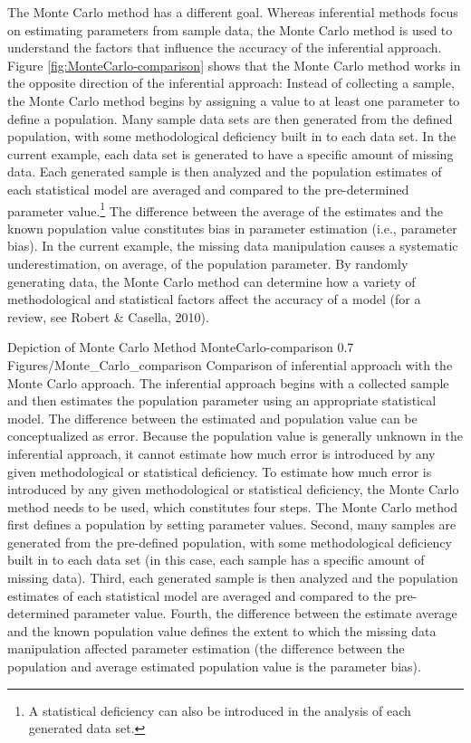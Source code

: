 \documentclass[
12pt, %
twoside,
english]{guelphthesis}
\theoremstyle{definition}
\theoremstyle{definition}
\theoremstyle{definition}
\theoremstyle{definition}
\theoremstyle{remark}
\begin{document}
The Monte Carlo method has a different goal. Whereas inferential methods focus on estimating parameters from sample data, the Monte Carlo method is used to understand the factors that influence the accuracy of the inferential approach. Figure \ref{fig:MonteCarlo-comparison} shows that the Monte Carlo method works in the opposite direction of the inferential approach: Instead of collecting a sample, the Monte Carlo method begins by assigning a value to at least one parameter to define a population. Many sample data sets are then generated from the defined population, with some methodological deficiency built in to each data set. In the current example, each data set is generated to have a specific amount of missing data. Each generated sample is then analyzed and the population estimates of each statistical model are averaged and compared to the pre-determined parameter value.\footnote{A statistical deficiency can also be introduced in the analysis of each generated data set.} The difference between the average of the estimates and the known population value constitutes bias in parameter estimation (i.e., parameter bias). In the current example, the missing data manipulation causes a systematic underestimation, on average, of the population parameter. By randomly generating data, the Monte Carlo method can determine how a variety of methodological and statistical factors affect the accuracy of a model (for a review, see Robert \& Casella, 2010).
\begin{apaFigure}
[landscape]
[samepage]
[0cm]
{Depiction of Monte Carlo Method}
{MonteCarlo-comparison}
{0.7}
{Figures/Monte_Carlo_comparison}
{Comparison of inferential approach with the Monte Carlo approach. The inferential approach begins with a collected sample and then estimates the population parameter using an appropriate statistical model. The difference between the estimated and population value can be conceptualized as error. Because the population value is generally unknown in the inferential approach, it cannot estimate how much error is introduced by any given methodological or statistical deficiency. To estimate how much error is introduced by any given methodological or statistical deficiency, the Monte Carlo method needs to be used, which constitutes four steps. The Monte Carlo method first defines a population by setting parameter values. Second, many samples are generated from the pre-defined population, with some methodological deficiency built in to each data set (in this case, each sample has a specific amount of missing data). Third, each generated sample is then analyzed and the population estimates of each statistical model are averaged and compared to the pre-determined parameter value. Fourth, the difference between the estimate average and the known population value defines the extent to which the missing data manipulation affected parameter estimation (the difference between the population and average estimated population value is the parameter bias).}
\end{apaFigure}
\end{document}
